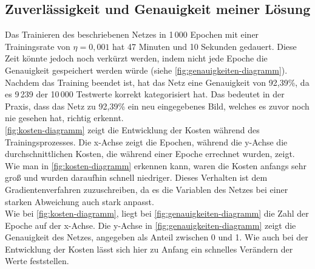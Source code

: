 \subsection{Zuverlässigkeit und Genauigkeit meiner Lösung}\label{subsec:zuverlassigkeit}
Das Trainieren des beschriebenen Netzes in 1\,000 Epochen mit einer Trainingsrate von $\eta = 0,001$ hat 47 Minuten und 10 Sekunden gedauert.
Diese Zeit könnte jedoch noch verkürzt werden, indem nicht jede Epoche die Genauigkeit gespeichert werden würde (siehe \autoref{fig:genauigkeiten-diagramm}).
Nachdem das Training beendet ist, hat das Netz eine Genauigkeit von 92,39\%, da es 9\,239 der 10\,000 Testwerte korrekt kategorisiert hat.
Das bedeutet in der Praxis, dass das Netz zu 92,39\% ein neu eingegebenes Bild, welches es zuvor noch nie gesehen hat, richtig erkennt.\\
\autoref{fig:kosten-diagramm} zeigt die Entwicklung der Kosten während des Trainingsprozesses.
Die x-Achse zeigt die Epochen, während die y-Achse die durchschnittlichen Kosten, die während einer Epoche errechnet wurden, zeigt.
Wie man in \autoref{fig:kosten-diagramm} erkennen kann, waren die Kosten anfangs sehr groß und wurden daraufhin schnell niedriger.
Dieses Verhalten ist dem Gradientenverfahren zuzuschreiben, da es die Variablen des Netzes bei einer starken Abweichung auch stark anpasst.\\
Wie bei \autoref{fig:kosten-diagramm}, liegt bei \autoref{fig:genauigkeiten-diagramm} die Zahl der Epoche auf der x-Achse.
Die y-Achse in \autoref{fig:genauigkeiten-diagramm} zeigt die Genauigkeit des Netzes, angegeben als Anteil zwischen 0 und 1.
Wie auch bei der Entwicklung der Kosten lässt sich hier zu Anfang ein schnelles Verändern der Werte feststellen.
